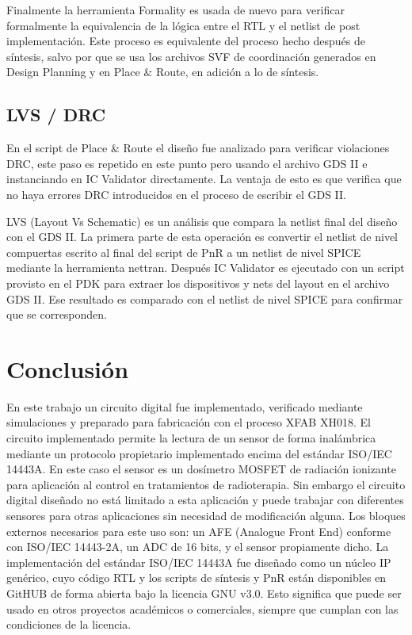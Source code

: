 \documentclass[a4paper, twoside, 11pt]{report}
\begin{document}
Finalmente la herramienta Formality es usada de nuevo para verificar formalmente la equivalencia de la lógica entre el RTL y el netlist de post implementación. Este proceso es equivalente del proceso hecho después de síntesis, salvo por que se usa los archivos SVF de coordinación generados en Design Planning y en Place \& Route, en adición a lo de síntesis.

\FloatBarrier
\section{LVS / DRC}

En el script de Place \& Route el diseño fue analizado para verificar violaciones DRC, este paso es repetido en este punto pero usando el archivo GDS II e instanciando en IC Validator directamente. La ventaja de esto es que verifica que no haya errores DRC introducidos en el proceso de escribir el GDS II.

LVS (Layout Vs Schematic) es un análisis que compara la netlist final del diseño con el GDS II. La primera parte de esta operación es convertir el netlist de nivel compuertas escrito al final del script de PnR a un netlist de nivel SPICE mediante la herramienta nettran. Después IC Validator es ejecutado con un script provisto en el PDK para extraer los dispositivos y nets del layout en el archivo GDS II. Ese resultado es comparado con el netlist de nivel SPICE para confirmar que se corresponden.


\FloatBarrier
\chapter{Conclusión}

En este trabajo un circuito digital fue implementado, verificado mediante simulaciones y preparado para fabricación con el proceso XFAB XH018. El circuito implementado permite la lectura de un sensor de forma inalámbrica mediante un protocolo propietario implementado encima del estándar ISO/IEC 14443A. En este caso el sensor es un dosímetro MOSFET de radiación ionizante para aplicación al control en tratamientos de radioterapia. Sin embargo el circuito digital diseñado no está limitado a esta aplicación y puede trabajar con diferentes sensores para otras aplicaciones sin necesidad de modificación alguna. Los bloques externos necesarios para este uso son: un AFE (Analogue Front End) conforme con ISO/IEC 14443-2A, un ADC de 16 bits, y el sensor propiamente dicho. La implementación del estándar ISO/IEC 14443A fue diseñado como un núcleo IP genérico, cuyo código RTL y los scripts de síntesis y PnR están disponibles en GitHUB de forma abierta bajo la licencia GNU v3.0. Esto significa que puede ser usado en otros proyectos académicos o comerciales, siempre que cumplan con las condiciones de la licencia.
\end{document}
